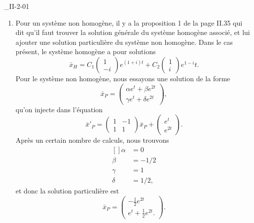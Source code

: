 \begin{corrige}{_II-2-01}
\begin{enumerate}
\item
Pour un système non homogène, il y a la proposition 1 de la page II.35 qui dit qu'il faut trouver la solution générale du système homogène associé, et lui ajouter une solution particulière du système non homogène. Dans le cas présent, le système homogène a pour solutions
\begin{equation}
	\bar x_H=C_1\begin{pmatrix}
	1	\\ 
	-i	
\end{pmatrix} e^{(1+i)t}+C_2\begin{pmatrix}
	1	\\ 
	i	
\end{pmatrix} e^{1-i}t.
\end{equation}
Pour le système non homogène, nous essayons une solution de la forme
\begin{equation}
	\bar x_P=\begin{pmatrix}
	\alpha e^t+\beta e^{2t}	\\ 
	\gamma e^t+\delta e^{2t}	
\end{pmatrix},
\end{equation}
qu'on injecte dans l'équation
\begin{equation}
	\bar x'_P=\begin{pmatrix}
	1	&	-1	\\ 
	1	&	1	
\end{pmatrix}\bar x_P+\begin{pmatrix}
	e^t	\\ 
	 e^{2t}	
\end{pmatrix}.
\end{equation}
Après un certain nombre de calculs, nous trouvons
\begin{equation}
	\begin{aligned}[]
		\alpha&=0\\
		\beta&=-1/2\\
		\gamma&=1\\
		\delta&=1/2,
	\end{aligned}
\end{equation}
et donc la solution particulière est
\begin{equation}
	\bar x_P=\begin{pmatrix}
	-\frac{ 1 }{2} e^{2t}	\\ 
	e^t+\frac{ 1 }{2} e^{2t}.	
\end{pmatrix}.
\end{equation}

\end{enumerate}

\end{corrige}
